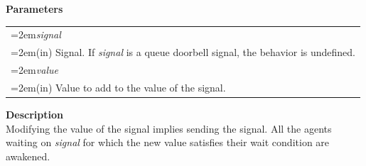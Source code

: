 \documentclass[final]{book}
\newcommand{\hsaarg}[1]{\textit{#1}}
\begin{document}
\noindent\textbf{Parameters}\\[-6mm]
\noindent\begin{longtable}{@{}>{\hangindent=2em}p{\textwidth}}
\hsaarg{signal}\\\hspace{2em}(in) Signal. If \textit{signal} is a queue doorbell signal, the behavior is undefined.\\[2mm]
\hsaarg{value}\\\hspace{2em}(in) Value to add to the value of the signal.
\end{longtable}
\vspace{-5mm}\noindent\textbf{Description}\\[1mm]
Modifying the value of the signal implies sending the signal. All the agents waiting on \textit{signal} for which the new value satisfies their wait condition are awakened.
\end{document}
